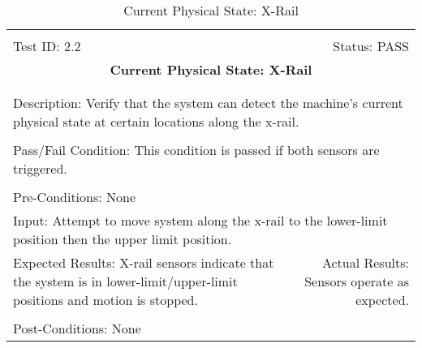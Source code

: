 \documentclass[titlepage]{article}
\begin{document}
\begin{center}
\begin{table}[h!]
\begin{tabular}{|l r|}\hline&\\[-2mm]
	Test ID: 2.2	&Status: PASS\\[-3mm]
	\multicolumn{2}{|c|}{\textbf{\large{Current Physical State: X-Rail}}}\\&\\\hline&\\[-3mm]
	\multicolumn{2}{|p{\textwidth}|}{Description: Verify that the system can detect the machine's current physical state at certain locations along the x-rail.}\\[1mm]\hline&\\[-3mm]
	\multicolumn{2}{|p{\textwidth}|}{Pass/Fail Condition: This condition is passed if both sensors are triggered.}\\[1mm]\hline&\\[-3mm]
	\multicolumn{2}{|p{\textwidth}|}{Pre-Conditions: None}\\[4mm]
	\multicolumn{2}{|p{\textwidth}|}{Input: Attempt to move system along the x-rail to the lower-limit position then the upper limit position.}\\[2mm]\hline
	\multicolumn{1}{|p{0.49\textwidth}}{Expected Results: X-rail sensors indicate that the system is in lower-limit/upper-limit positions and motion is stopped.}	&\multicolumn{1}{|p{0.45\textwidth}|}{Actual Results: Sensors operate as expected.}\\\hline&\\[-3mm]
	\multicolumn{2}{|p{\textwidth}|}{Post-Conditions: None}\\\hline
\end{tabular}
\caption{Current Physical State: X-Rail}
\end{table}
\end{center}
\end{document}
